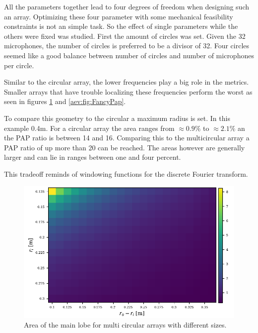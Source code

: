 All the parameters together lead to four degrees of freedom when designing such an array.
Optimizing these four parameter with some mechanical feasibility constraints is not an simple task.
So the effect of single parameters while the others were fixed was studied.
First the amount of circles was set.
Given the 32 microphones, the number of circles is preferred to be a divisor of 32.
Four circles seemed like a good balance between number of circles and number of microphones
per circle.

Similar to the circular array, the lower frequencies play a big role in the metrics.
Smaller arrays that have trouble localizing these frequencies perform the worst as seen
in figures \ref{aev:fig:FancyArea} and \ref{aev:fig:FancyPap}.

To compare this geometry to the circular a maximum radius is set.
In this example 0.4m.
For a circular array the area ranges from $\approx 0.9\%$ to
$\approx 2.1\%$ an the PAP ratio is between 14 and 16.
Comparing this to the multicircular array a PAP ratio of up
more than 20 can be reached.
The areas however are generally larger and can lie in ranges
between one and four percent.

This tradeoff reminds of windowing functions for the discrete
Fourier transform.
\begin{figure}[h]
	\centering
	\includegraphics[]{images/5_array_evaluation/fancy_area.pdf}
	\caption{Area of the main lobe for multi circular arrays with different
		sizes.}
	\label{aev:fig:FancyArea}
\end{figure}

